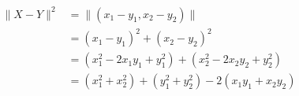 \documentclass[preview]{standalone}
\begin{document}
\begin{align*}
\lVert X-Y \rVert ^{2}& = \lVert (x_{1}-y_{1},x_{2}-y_{2}) \rVert \\ & =(x_{1}-y_{1})^2 + (x_{2}-y_{2})^2 \\ & =(x_{1}^2 - 2x_{1}y_{1}+ y_{1}^2)+(x_{2}^2 - 2x_{2}y_{2}+ y_{2}^2) \\ & =(x_{1}^2+x_{2}^2)+(y_{1}^2+y_{2}^2) -2(x_{1}y_{1}+x_{2}y_{2})
\end{align*}
\end{document}
